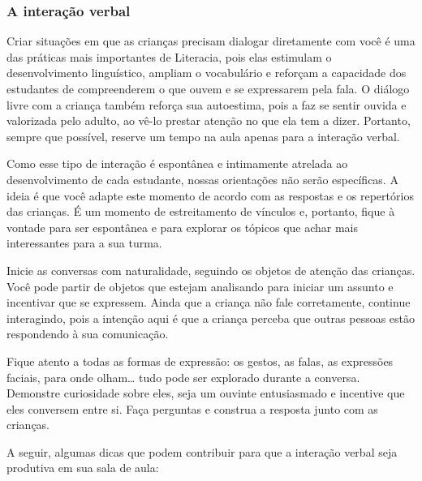 \documentclass[11pt]{extarticle}
\begin{document}
\subsubsection{A interação verbal} 
Criar situações em que as crianças precisam dialogar diretamente com 
você é uma das práticas mais importantes de Literacia, pois elas estimulam 
o desenvolvimento linguístico, ampliam o vocabulário e reforçam a 
capacidade dos estudantes de compreenderem o que ouvem e se expressarem 
pela fala. O diálogo livre com a criança também reforça sua autoestima, pois 
a faz se sentir ouvida e valorizada pelo adulto, ao vê-lo prestar atenção 
no que ela tem a dizer. Portanto, sempre que possível, reserve um tempo na 
aula apenas para a interação verbal. 

Como esse tipo de interação é espontânea e intimamente atrelada ao 
desenvolvimento de cada estudante, nossas orientações não serão específicas. 
A ideia é que você adapte este momento de acordo com as respostas e os 
repertórios das crianças. É um momento de estreitamento de vínculos e, portanto, 
fique à vontade para ser espontânea e para explorar os tópicos que achar 
mais interessantes para a sua turma.

Inicie as conversas com naturalidade, seguindo os objetos de atenção das crianças. 
Você pode partir de objetos que estejam analisando
para iniciar um assunto e incentivar que se expressem. Ainda que a
criança não fale corretamente, continue interagindo, 
pois a intenção aqui é que a criança perceba que outras pessoas estão respondendo 
à sua comunicação. 

Fique atento a todas as formas de expressão: os gestos, as falas, as 
expressões faciais, para onde olham\ldots{} tudo pode ser explorado durante a conversa. 
Demonstre curiosidade sobre eles, seja um ouvinte entusiasmado e incentive que eles 
conversem entre si. Faça perguntas e construa a resposta junto com as crianças. 

A seguir, algumas dicas que podem contribuir para que a interação verbal 
seja produtiva em sua sala de aula: 
\end{document}
